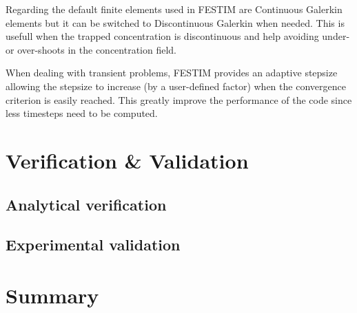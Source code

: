 Regarding the default finite elements used in FESTIM are Continuous Galerkin elements but it can be switched to Discontinuous Galerkin when needed.
This is usefull when the trapped concentration is discontinuous and help avoiding under- or over-shoots in the concentration field.

When dealing with transient problems, FESTIM provides an adaptive stepsize allowing the stepsize to increase (by a user-defined factor) when the convergence criterion is easily reached.
This greatly improve the performance of the code since less timesteps need to be computed.



\section{Verification \& Validation}
\subsection{Analytical verification}



\subsection{Experimental validation}



\section{Summary}